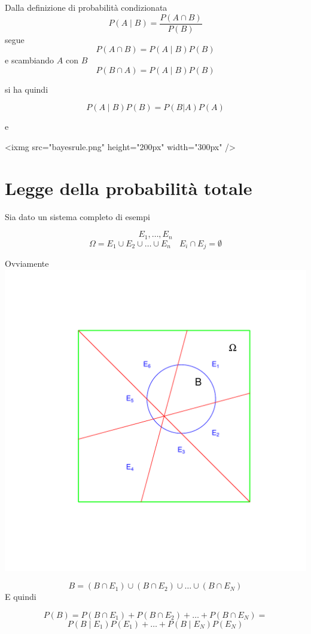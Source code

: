 \documentclass[onecolumn,12pt]{book}\usepackage[]{graphicx}\usepackage[]{color}
\makeatletter
\def\maxwidth{ %
  \ifdim\Gin@nat@width>\linewidth
    \linewidth
  \else
    \Gin@nat@width
  \fi
}
\newenvironment{knitrout}{}{} %
\makeatother
\begin{document}
Dalla  definizione di probabilità condizionata
\[P(A \mid B)=\dfrac{P(A \cap  B)}{P(B)}\]  segue
\[P(A \cap B)=P(A \mid  B) P(B)\]  e scambiando $A$ con $B$
$$P(B \cap A)=P(A \mid  B) P(B)$$
 
si ha quindi
 
$$P(A \mid  B)P(B) = P(B | A) P(A)$$

e

<ixmg src="bayesrule.png" height="200px" width="300px" />

 
\section{Legge della probabilità totale}

Sia dato un sistema completo di esempi 

$$E_1,\ldots,E_n$$
$$\Omega=E_1\cup E_2\cup\ldots\cup E_n\quad E_i\cap E_j=\emptyset$$

Ovviamente
\begin{knitrout}
\color{fgcolor}
\includegraphics[width=\maxwidth]{figure/unnamed-chunk-14-1} 

\end{knitrout}
$$B=(B\cap E_1)\cup (B\cap E_2)\cup\ldots \cup (B\cap E_N)$$
E quindi

$$P(B)=P(B\cap E_1)+P(B\cap E_2)+\ldots+ P(B\cap E_N)=$$
$$ P(B\mid E_1)P(E_1)+\ldots+P(B\mid E_N)P(E_N)$$
\end{document}
